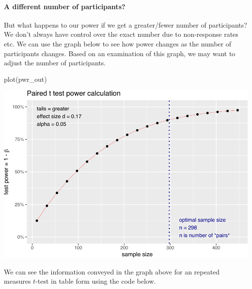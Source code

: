 \documentclass[
]{krantz}
\makeatletter
\newenvironment{Shaded}{\begin{snugshade}}{\end{snugshade}}
\newcommand{\FunctionTok}[1]{\textcolor[rgb]{0,0,0}{#1}}
\newcommand{\NormalTok}[1]{#1}
\newenvironment{kframe}{%
\medskip{}
\setlength{\fboxsep}{.8em}
 \def\at@end@of@kframe{}%
 \ifinner\ifhmode%
  \def\at@end@of@kframe{\end{minipage}}%
  \begin{minipage}{\columnwidth}%
 \fi\fi%
 \def\FrameCommand##1{\hskip\@totalleftmargin \hskip-\fboxsep
 \colorbox{shadecolor}{##1}\hskip-\fboxsep
     \hskip-\linewidth \hskip-\@totalleftmargin \hskip\columnwidth}%
 \MakeFramed {\advance\hsize-\width
   \@totalleftmargin\z@ \linewidth\hsize
   \@setminipage}}%
 {\par\unskip\endMakeFramed%
 \at@end@of@kframe}
\renewenvironment{Shaded}{\begin{kframe}}{\end{kframe}}
\makeatother
\begin{document}
\hypertarget{a-different-number-of-participants-1}{%
\paragraph{A different number of participants?}\label{a-different-number-of-participants-1}}

But what happens to our power if we get a greater/fewer number of participants? We don't always have control over the exact number due to non-response rates etc. We can use the graph below to see how power changes as the number of participants changes. Based on an examination of this graph, we may want to adjust the number of participants.

\begin{Shaded}
\begin{Highlighting}[]
\FunctionTok{plot}\NormalTok{(pwr\_out)}
\end{Highlighting}
\end{Shaded}

\includegraphics{bookdown_files/figure-latex/unnamed-chunk-352-1.pdf}

We can see the information conveyed in the graph above for an repeated measures \(t\)-test in table form using the code below.
\end{document}
